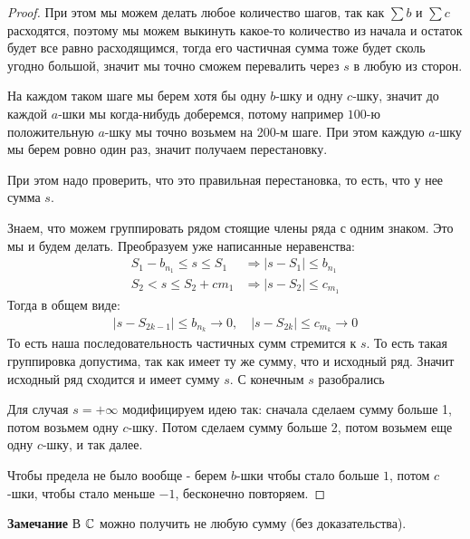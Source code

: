 \begin{proof}
    При этом мы можем делать любое количество шагов, так как $\sum b$ и $\sum c$ расходятся, поэтому мы можем
    выкинуть какое-то количество из начала и остаток будет все равно расходящимся, тогда его частичная сумма тоже будет сколь угодно большой,
    значит мы точно сможем перевалить через $s$ в любую из сторон.

    На каждом таком шаге мы берем хотя бы одну $b$-шку и одну $c$-шку, значит до каждой $a$-шки мы когда-нибудь доберемся, потому
    например $100$-ю положительную $a$-шку мы точно возьмем на 200-м шаге.
    При этом каждую $a$-шку мы берем ровно один раз, значит получаем перестановку.
    
    При этом надо проверить, что это правильная перестановка, то есть, что у нее сумма $s$.

    Знаем, что можем группировать рядом стоящие члены ряда с одним знаком. Это мы и будем делать. 
    Преобразуем уже написанные неравенства:
    \begin{align*}
        S_1 - b_{n_1} \leqslant s \leqslant S_1 &\Longrightarrow |s - S_1| \leqslant b_{n_1} \\
        S_2 < s \leqslant S_2 + c{m_1} &\Longrightarrow |s - S_2| \leqslant c_{m_1}
    \end{align*}
    Тогда в общем виде:
    \begin{gather*}
        |s - S_{2k-1}| \leq b_{n_k} \to 0, \quad |s - S_{2k}| \leq c_{m_k} \to 0
    \end{gather*}
    То есть наша последовательность частичных сумм стремится к $s$. То есть такая группировка допустима, так как имеет ту же сумму, что и исходный ряд. 
    Значит исходный ряд сходится и имеет сумму $s$. С конечным $s$ разобрались

    Для случая $s = +\infty$ модифицируем идею так: сначала сделаем сумму больше 1, потом возьмем одну $c$-шку. Потом сделаем
    сумму больше 2, потом возьмем еще одну $c$-шку, и так далее. 
    
    Чтобы предела не было вообще - берем $b$-шки чтобы стало больше $1$,
    потом $c$-шки, чтобы стало меньше $-1$, бесконечно повторяем.
\end{proof}

\textbf{Замечание} В $\mathbb{C}$ можно получить не любую сумму (без доказательства).